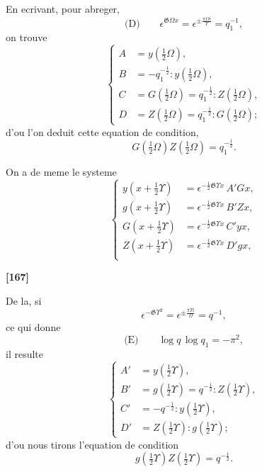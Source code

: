\documentclass[11pt,a4paper]{book}
\begin{document}
En ecrivant, pour abreger,
\begin{equation*}
\text{(D)}\qquad \epsilon^{\mathfrak{G}\Omega x} = \epsilon^{\pm \frac{\pi\Omega i}{\Upsilon}} = q_1^{-1},
\end{equation*}
on trouve
\begin{equation}
\left\{
\begin{aligned}
A &= y\left(\tfrac{1}{2}\Omega\right),\\
B &= -q_1^{-\frac{1}{2}} : y\left(\tfrac{1}{2}\Omega\right),\\
C &= G\left(\tfrac{1}{2}\Omega\right) = q_1^{-\frac{1}{2}} : Z\left(\tfrac{1}{2}\Omega\right),\\
D &= Z\left(\tfrac{1}{2}\Omega\right) = q_1^{-\frac{1}{2}} : G\left(\tfrac{1}{2}\Omega\right);
\end{aligned}
\right. \tag{23}
\end{equation}
d'ou l'on deduit cette equation de condition,
\begin{equation}
G\left(\tfrac{1}{2}\Omega\right) Z\left(\tfrac{1}{2}\Omega\right) = q_1^{-\frac{1}{2}}. \tag{24}
\end{equation}

On a de meme le systeme
\begin{equation}
\left\{
\begin{aligned}
y\left(x + \tfrac{1}{2}\Upsilon\right) &= \epsilon^{-\frac{1}{2}\mathfrak{G}\Upsilon x}\, A'Gx,\\
g\left(x + \tfrac{1}{2}\Upsilon\right) &= \epsilon^{-\frac{1}{2}\mathfrak{G}\Upsilon x}\, B'Zx,\\
G\left(x + \tfrac{1}{2}\Upsilon\right) &= \epsilon^{-\frac{1}{2}\mathfrak{G}\Upsilon x}\, C'yx,\\
Z\left(x + \tfrac{1}{2}\Upsilon\right) &= \epsilon^{-\frac{1}{2}\mathfrak{G}\Upsilon x}\, D'gx,\\
\end{aligned}
\right. \tag{25}
\end{equation}


\textbf{[167]}

De la, si
\[\epsilon^{-\mathfrak{G}\Upsilon^2} = \epsilon^{\pm \frac{\pi\Upsilon i}{\Omega}} = q^{-1},\]
ce qui donne
\begin{equation*}
\text{(E)}\qquad \log q\, \log q_1 = -\pi^2,
\end{equation*}
il resulte
\begin{equation}
\left\{
\begin{aligned}
A' &= y\left(\tfrac{1}{2}\Upsilon\right),\\
B' &= g\left(\tfrac{1}{2}\Upsilon\right) = q^{-\frac{1}{2}} : Z\left(\tfrac{1}{2}\Upsilon\right),\\
C' &= -q^{-\frac{1}{2}} : y\left(\tfrac{1}{2}\Upsilon\right),\\
D' &= Z\left(\tfrac{1}{2}\Upsilon\right) : g\left(\tfrac{1}{2}\Upsilon\right);
\end{aligned}
\right. \tag{26}
\end{equation}
d'ou nous tirons l'equation de condition
\begin{equation}
g\left(\tfrac{1}{2}\Upsilon\right) Z\left(\tfrac{1}{2}\Upsilon\right) = q^{-\frac{1}{2}}. \tag{27}
\end{equation}
\end{document}
